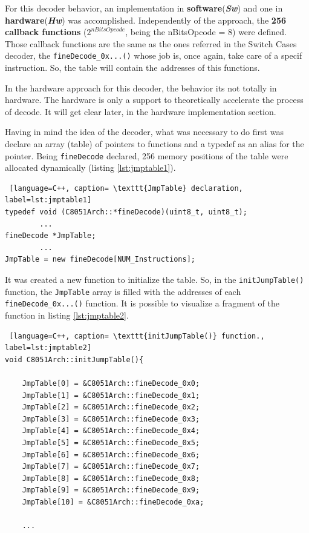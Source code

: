 For this decoder behavior, an implementation in \textbf{software}(\textbf{\textit{Sw}}) and one in \textbf{hardware}(\textit{\textbf{Hw}}) was accomplished. Independently of the approach, the \textbf{256 callback functions} ($2^{nBitsOpcode}$, being the nBitsOpcode = 8) were defined. Those callback functions are the same as the ones referred in the Switch Cases decoder, the \texttt{fineDecode\_0x...()} whose job is, once again, take care of a specif instruction. So, the table will contain the addresses of this functions. 

In the hardware approach for this decoder, the behavior its not totally in hardware. The hardware is only a support to theoretically accelerate the process of decode. It will get clear later, in the hardware implementation section.


Having in mind the idea of the decoder, what was necessary to do first was declare an array (table) of pointers to functions and a typedef as an alias for the pointer. Being \texttt{fineDecode} declared, 256 memory positions of the table were allocated dynamically (listing \ref{lst:jmptable1}). 

\begin{lstlisting} [language=C++, caption= \texttt{JmpTable} declaration, label=lst:jmptable1]
typedef void (C8051Arch::*fineDecode)(uint8_t, uint8_t);
		...
fineDecode *JmpTable;
		...
JmpTable = new fineDecode[NUM_Instructions];
\end{lstlisting}


It was created a new function to initialize the table. So, in the \texttt{initJumpTable()} function, the \texttt{JmpTable} array is filled with the addresses of each \texttt{fineDecode\_0x...()} function. It is possible to visualize a fragment of the function in listing \ref{lst:jmptable2}.   

\begin{lstlisting} [language=C++, caption= \texttt{initJumpTable()} function., label=lst:jmptable2]
void C8051Arch::initJumpTable(){

    JmpTable[0] = &C8051Arch::fineDecode_0x0;
    JmpTable[1] = &C8051Arch::fineDecode_0x1;
    JmpTable[2] = &C8051Arch::fineDecode_0x2;
    JmpTable[3] = &C8051Arch::fineDecode_0x3;
    JmpTable[4] = &C8051Arch::fineDecode_0x4;
    JmpTable[5] = &C8051Arch::fineDecode_0x5;
    JmpTable[6] = &C8051Arch::fineDecode_0x6;
    JmpTable[7] = &C8051Arch::fineDecode_0x7;
    JmpTable[8] = &C8051Arch::fineDecode_0x8;
    JmpTable[9] = &C8051Arch::fineDecode_0x9;
    JmpTable[10] = &C8051Arch::fineDecode_0xa;
    
    ...
\end{lstlisting}

